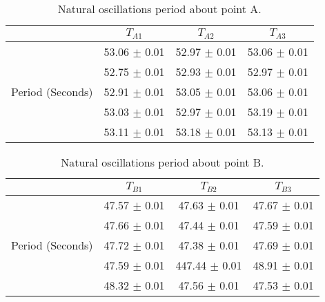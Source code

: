 \begin{table}[h!]
\begin{tabular}[b]{ | c | c | c | c | }
\hline
 & $T_{A1}$ & $T_{A2}$ & $T_{A3}$\\
\hline
\multirow{5}{10em}{Period (Seconds)} & 53.06 $\pm$ 0.01 & 52.97 $\pm$ 0.01  & 53.06 $\pm$ 0.01 \\
& 52.75 $\pm$ 0.01 & 52.93 $\pm$ 0.01 & 52.97 $\pm$ 0.01 \\
&52.91 $\pm$ 0.01 & 53.05 $\pm$ 0.01 & 53.06 $\pm$ 0.01 \\
& 53.03 $\pm$ 0.01 & 52.97 $\pm$ 0.01 & 53.19 $\pm$ 0.01 \\ 
& 53.11 $\pm$ 0.01 & 53.18 $\pm$ 0.01 & 53.13 $\pm$ 0.01 \\
\hline
\end{tabular}
\caption{Natural oscillations period about point A.}
\label{table:1}
\end{table}

\begin{table}[H]
\begin{tabular}[b]{ | c | c | c | c |}
\hline
& $T_{B1}$ & $T_{B2}$ & $T_{B3}$\\
\hline
\multirow{5}{10em}{Period (Seconds)} & 47.57 $\pm$ 0.01 & 47.63 $\pm$ 0.01 & 47.67 $\pm$ 0.01 \\
& 47.66 $\pm$ 0.01 & 47.44 $\pm$ 0.01 & 47.59 $\pm$ 0.01 \\
&47.72 $\pm$ 0.01 & 47.38 $\pm$ 0.01 & 47.69 $\pm$ 0.01 \\
&47.59 $\pm$ 0.01 & 447.44 $\pm$ 0.01 & 48.91 $\pm$ 0.01 \\
&48.32 $\pm$ 0.01 & 47.56 $\pm$ 0.01 & 47.53 $\pm$ 0.01 \\
\hline
\end{tabular}
\caption{Natural oscillations period about point B.}
\label{table:2}
\end{table}

